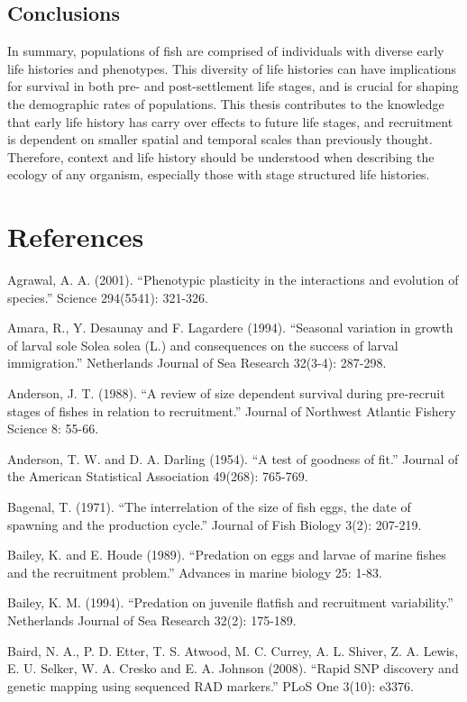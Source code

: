 \documentclass[]{book}
\begin{document}
\section{Conclusions}\label{conclusions}

In summary, populations of fish are comprised of individuals with
diverse early life histories and phenotypes. This diversity of life
histories can have implications for survival in both pre- and
post-settlement life stages, and is crucial for shaping the demographic
rates of populations. This thesis contributes to the knowledge that
early life history has carry over effects to future life stages, and
recruitment is dependent on smaller spatial and temporal scales than
previously thought. Therefore, context and life history should be
understood when describing the ecology of any organism, especially those
with stage structured life histories.

\chapter{References}\label{references}

Agrawal, A. A. (2001). ``Phenotypic plasticity in the interactions and
evolution of species.'' Science 294(5541): 321-326.

Amara, R., Y. Desaunay and F. Lagardere (1994). ``Seasonal variation in
growth of larval sole Solea solea (L.) and consequences on the success
of larval immigration.'' Netherlands Journal of Sea Research 32(3-4):
287-298.

Anderson, J. T. (1988). ``A review of size dependent survival during
pre-recruit stages of fishes in relation to recruitment.'' Journal of
Northwest Atlantic Fishery Science 8: 55-66.

Anderson, T. W. and D. A. Darling (1954). ``A test of goodness of fit.''
Journal of the American Statistical Association 49(268): 765-769.

Bagenal, T. (1971). ``The interrelation of the size of fish eggs, the
date of spawning and the production cycle.'' Journal of Fish Biology
3(2): 207-219.

Bailey, K. and E. Houde (1989). ``Predation on eggs and larvae of marine
fishes and the recruitment problem.'' Advances in marine biology 25:
1-83.

Bailey, K. M. (1994). ``Predation on juvenile flatfish and recruitment
variability.'' Netherlands Journal of Sea Research 32(2): 175-189.

Baird, N. A., P. D. Etter, T. S. Atwood, M. C. Currey, A. L. Shiver, Z.
A. Lewis, E. U. Selker, W. A. Cresko and E. A. Johnson (2008). ``Rapid
SNP discovery and genetic mapping using sequenced RAD markers.'' PLoS
One 3(10): e3376.
\end{document}
